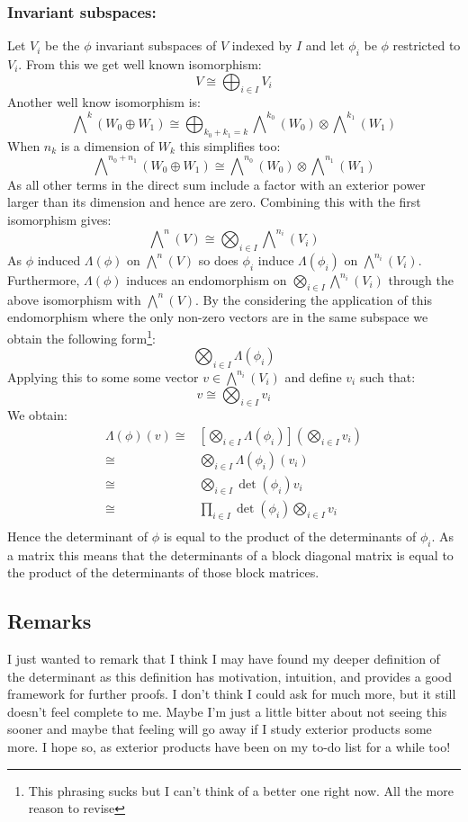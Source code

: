 \subsubsection{Invariant subspaces:}
Let $V_i$ be the $\phi$ invariant subspaces of $V$ indexed by $I$ and let $\phi_i$ be $\phi$ restricted to $V_i$.
From this we get well known isomorphism:
\[V \cong \bigoplus_{i\in I} V_i\]
Another well know isomorphism is:
\[\bigwedge\nolimits^k(W_0\oplus W_1) \cong \bigoplus_{k_0+k_1=k}\bigwedge\nolimits^{k_0}(W_0)\otimes\bigwedge\nolimits^{k_1}(W_1)\]
When $n_k$ is a dimension of $W_k$ this simplifies too:
\[\bigwedge\nolimits^{n_0+n_1}(W_0\oplus W_1) \cong \bigwedge\nolimits^{n_0}(W_0)\otimes\bigwedge\nolimits^{n_1}(W_1)\]
As all other terms in the direct sum include a factor with an exterior power larger than its dimension and hence are zero.
Combining this with the first isomorphism gives:
\[\bigwedge\nolimits^n(V) \cong \bigotimes_{i\in I}\bigwedge\nolimits^{n_i}(V_i)\]
As $\phi$ induced $\Lambda(\phi)$ on $\bigwedge\nolimits^n(V)$ so does $\phi_i$ induce $\Lambda(\phi_i)$ on $\bigwedge\nolimits^{n_i}(V_i)$.
Furthermore,
$\Lambda(\phi)$ induces an endomorphism on $\bigotimes_{i\in I}\bigwedge\nolimits^{n_i}(V_i)$ through the above isomorphism with $\bigwedge\nolimits^{n}(V)$.
By the considering the application of this endomorphism where the only non-zero vectors are in the same subspace we obtain the following form\footnote{This phrasing sucks but I can't think of a better one right now.
All the more reason to revise}:
\[\bigotimes_{i\in I}\Lambda(\phi_i)\]
Applying this to some some vector $v\in \bigwedge\nolimits^{n_i}(V_i)$ and define $v_i$ such that:
\[v \cong \bigotimes_{i\in I}v_i\]
We obtain:
\[\begin{aligned} 
	\Lambda(\phi)(v) \cong& \left[\bigotimes_{i\in I}\Lambda(\phi_i)\right]\left(\bigotimes_{i\in I}v_i\right)\\
	\cong& \bigotimes_{i\in I}\Lambda(\phi_i)(v_i)\\
	\cong& \bigotimes_{i\in I}\det(\phi_i)v_i\\
	\cong& \prod_{i\in I}\det(\phi_i)\bigotimes_{i\in I}v_i\\
\end{aligned}\]
Hence the determinant of $\phi$ is equal to the product of the determinants of $\phi_i$.
As a matrix this means that the determinants of a block diagonal matrix is equal to the product of the determinants of those block matrices.

\subsection{Remarks}
I just wanted to remark that I think I may have found my deeper definition of the determinant as this definition has motivation, intuition, and provides a good framework for further proofs.
I don't think I could ask for much more,
but it still doesn't feel complete to me.
Maybe I'm just a little bitter about not seeing this sooner and maybe that feeling will go away if I study exterior products some more.
I hope so, 
as exterior products have been on my to-do list for a while too!

